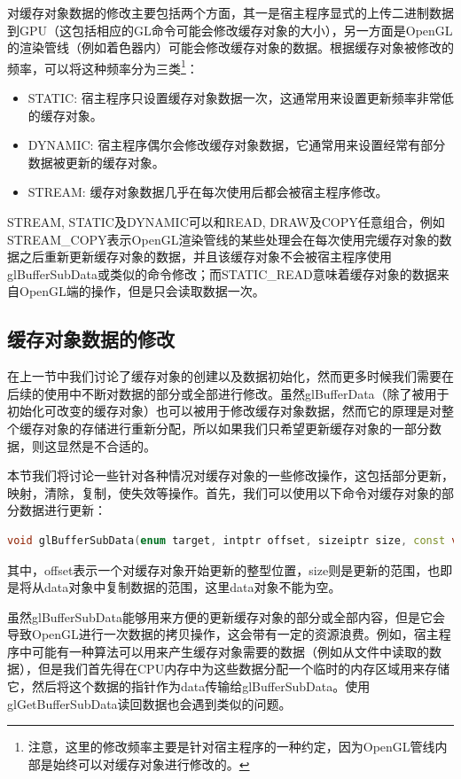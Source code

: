 对缓存对象数据的修改主要包括两个方面，其一是宿主程序显式的上传二进制数据到GPU（这包括相应的GL命令可能会修改缓存对象的大小），另一方面是OpenGL的渲染管线（例如着色器内）可能会修改缓存对象的数据。根据缓存对象被修改的频率，可以将这种频率分为三类\footnote{注意，这里的修改频率主要是针对宿主程序的一种约定，因为OpenGL管线内部是始终可以对缓存对象进行修改的。}：

\begin{itemize}
	\item STATIC: 宿主程序只设置缓存对象数据一次，这通常用来设置更新频率非常低的缓存对象。
	\item DYNAMIC: 宿主程序偶尔会修改缓存对象数据，它通常用来设置经常有部分数据被更新的缓存对象。
	\item STREAM: 缓存对象数据几乎在每次使用后都会被宿主程序修改。
\end{itemize}

STREAM, STATIC及DYNAMIC可以和READ, DRAW及COPY任意组合，例如STREAM\_COPY表示OpenGL渲染管线的某些处理会在每次使用完缓存对象的数据之后重新更新缓存对象的数据，并且该缓存对象不会被宿主程序使用glBufferSubData​或类似的命令修改；而STATIC\_READ意味着缓存对象的数据来自OpenGL端的操作，但是只会读取数据一次。 




\subsection{缓存对象数据的修改}
在上一节中我们讨论了缓存对象的创建以及数据初始化，然而更多时候我们需要在后续的使用中不断对数据的部分或全部进行修改。虽然glBufferData（除了被用于初始化可改变的缓存对象）也可以被用于修改缓存对象数据，然而它的原理是对整个缓存对象的存储进行重新分配，所以如果我们只希望更新缓存对象的一部分数据，则这显然是不合适的。

本节我们将讨论一些针对各种情况对缓存对象的一些修改操作，这包括部分更新，映射，清除，复制，使失效等操作。首先，我们可以使用以下命令对缓存对象的部分数据进行更新：

\begin{lstlisting}[language=C++]
void glBufferSubData​(enum target, intptr offset, sizeiptr size, const void *data)
\end{lstlisting}

其中，offset表示一个对缓存对象开始更新的整型位置，size则是更新的范围，也即是将从data对象中复制数据的范围，这里data对象不能为空。

虽然glBufferSubData能够用来方便的更新缓存对象的部分或全部内容，但是它会导致OpenGL进行一次数据的拷贝操作，这会带有一定的资源浪费。例如，宿主程序中可能有一种算法可以用来产生缓存对象需要的数据（例如从文件中读取的数据），但是我们首先得在CPU内存中为这些数据分配一个临时的内存区域用来存储它，然后将这个数据的指针作为data传输给glBufferSubData。使用glGetBufferSubData读回数据也会遇到类似的问题。

